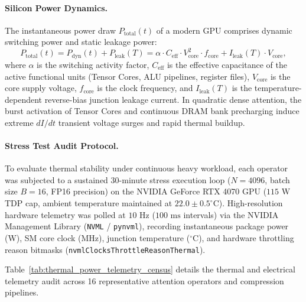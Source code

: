 \paragraph{Silicon Power Dynamics.}
The instantaneous power draw $P_{\text{total}}(t)$ of a modern GPU comprises dynamic switching power and static leakage power:
\begin{equation}
P_{\text{total}}(t) = P_{\text{dyn}}(t) + P_{\text{leak}}(T) = \alpha \cdot C_{\text{eff}} \cdot V_{\text{core}}^2 \cdot f_{\text{core}} + I_{\text{leak}}(T) \cdot V_{\text{core}},
\end{equation}
where $\alpha$ is the switching activity factor, $C_{\text{eff}}$ is the effective capacitance of the active functional units (Tensor Cores, ALU pipelines, register files), $V_{\text{core}}$ is the core supply voltage, $f_{\text{core}}$ is the clock frequency, and $I_{\text{leak}}(T)$ is the temperature-dependent reverse-bias junction leakage current. In quadratic dense attention, the burst activation of Tensor Cores and continuous DRAM bank precharging induce extreme $dI/dt$ transient voltage surges and rapid thermal buildup.

\paragraph{Stress Test Audit Protocol.}
To evaluate thermal stability under continuous heavy workload, each operator was subjected to a sustained 30-minute stress execution loop ($N=4096$, batch size $B=16$, FP16 precision) on the NVIDIA GeForce RTX 4070 GPU ($115\text{ W}$ TDP cap, ambient temperature maintained at $22.0 \pm 0.5^\circ\text{C}$). High-resolution hardware telemetry was polled at $10\text{ Hz}$ ($100\text{ ms}$ intervals) via the NVIDIA Management Library (\texttt{NVML} / \texttt{pynvml}), recording instantaneous package power (W), SM core clock (MHz), junction temperature ($^\circ\text{C}$), and hardware throttling reason bitmasks (\texttt{nvmlClocksThrottleReasonThermal}).

Table~\ref{tab:thermal_power_telemetry_census} details the thermal and electrical telemetry audit across 16 representative attention operators and compression pipelines.

